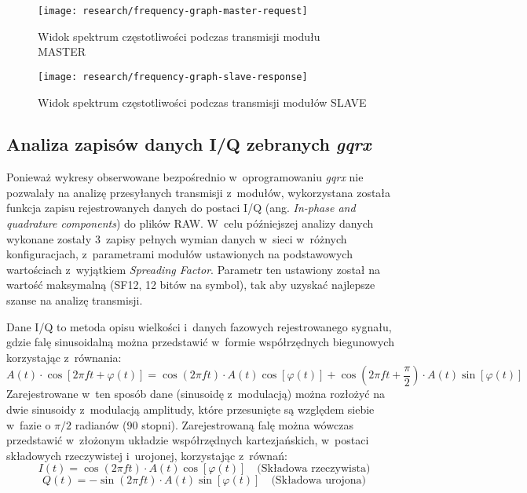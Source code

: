 \begin{figure}[!htbp]
    \centering
    \texttt{[image: research/frequency-graph-master-request]}
    \caption{\label{img:frequency-graph-master-request}Widok spektrum częstotliwości podczas transmisji modułu MASTER}
\end{figure}

\begin{figure}[!htbp]
    \centering
    \texttt{[image: research/frequency-graph-slave-response]}
    \caption{\label{img:frequency-graph-slave-response}Widok spektrum częstotliwości podczas transmisji modułów SLAVE}
\end{figure}

\FloatBarrier
\subsection{\label{sect:iq-data-gqrx}Analiza zapisów danych I/Q zebranych \textsl{gqrx}} Ponieważ wykresy obserwowane
bezpośrednio w~oprogramowaniu \textsl{gqrx} nie pozwalały na analizę przesyłanych transmisji z~modułów, wykorzystana
została funkcja zapisu rejestrowanych danych do postaci I/Q (ang. \textsl{In-phase and quadrature components}) do plików
RAW. W~celu późniejszej analizy danych wykonane zostały 3~zapisy pełnych wymian danych w~sieci w~różnych konfiguracjach,
z~parametrami modułów ustawionych na podstawowych wartościach z~wyjątkiem \textsl{Spreading Factor}. Parametr ten ustawiony
został na wartość maksymalną (SF12, 12 bitów na symbol), tak aby uzyskać najlepsze szanse na analizę transmisji.

Dane I/Q to metoda opisu wielkości i~danych fazowych rejestrowanego sygnału, gdzie falę sinusoidalną można przedstawić
w~formie współrzędnych biegunowych \cite{ni-iq-data} korzystając z~równania:
\begin{equation}
    A(t)\cdot\cos{\left[2\pi{ft}+\varphi(t)\right]}=\cos{(2\pi{ft})}\cdot A(t)\cos{\left[\varphi(t)\right]}+\cos{(2\pi{ft}+\frac{\pi}{2})}\cdot A(t)\sin{\left[\varphi(t)\right]}
\end{equation}
Zarejestrowane w~ten sposób dane (sinusoidę z~modulacją) można rozłożyć na dwie sinusoidy z~modulacją amplitudy, które
przesunięte są względem siebie w~fazie o ${\pi}/2$ radianów (90 stopni). Zarejestrowaną falę można wówczas przedstawić
w~złożonym układzie współrzędnych kartezjańskich, w~postaci składowych rzeczywistej i~urojonej, korzystając z~równań:
\begin{equation}
    I(t) = \cos{(2\pi{ft})}\cdot A(t)\cos{\left[\varphi(t)\right]} \quad\text{(Składowa rzeczywista)}
\end{equation}
\begin{equation}
    Q(t) = -\sin{(2\pi{ft})}\cdot A(t)\sin{\left[\varphi(t)\right]} \quad\text{(Składowa urojona)}
\end{equation}

